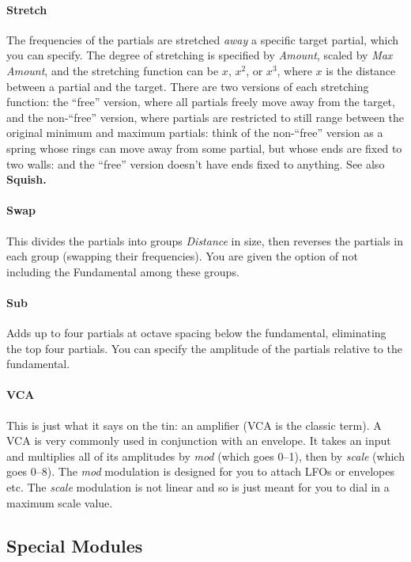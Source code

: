 \documentclass{article}
\begin{document}
\paragraph{Stretch} The frequencies of the partials are stretched {\it away} a specific target partial, which you can specify.  The degree of stretching is specified by {\it Amount}, scaled by {\it Max Amount}, and the stretching function can be \(x\), \(x^2\), or \(x^3\), where \(x\) is the distance between a partial and the target.  There are two versions of each stretching function: the ``free'' version, where all partials freely move away from the target, and the non-``free'' version, where partials are restricted to still range between the original minimum and maximum partials: think of the non-``free'' version as a spring whose rings can move away from some partial, but whose ends are fixed to two walls: and the ``free'' version doesn't have ends fixed to anything.  See also  {\bf Squish.}

\paragraph{Swap} This divides the partials into groups {\it Distance} in size, then reverses the partials in each group (swapping their frequencies).  You are given the option of not including the Fundamental among these groups.

\paragraph{Sub} Adds up to four partials at octave spacing below the fundamental, eliminating the top four partials.  You can specify the amplitude of the partials relative to the fundamental.

\paragraph{VCA} This is just what it says on the tin: an amplifier (VCA is the classic term).  A VCA is very commonly used in conjunction with an envelope.  It takes an input and multiplies all of its amplitudes by {\it mod} (which goes 0--1), then by {\it scale} (which goes 0--8).  The {\it mod} modulation is designed for you to attach LFOs or envelopes etc.  The {\it scale} modulation is not linear and so is just meant for you to dial in a maximum scale value. 

\subsection{Special Modules}
\end{document}
